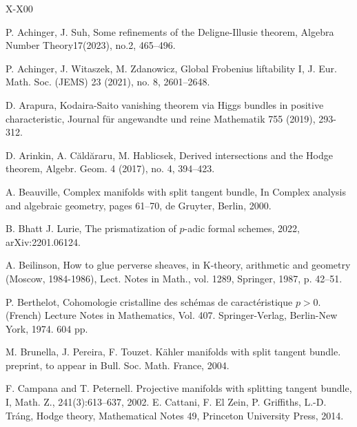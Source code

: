 \documentclass[12pt, a4paper]{article}
\begin{document}
\begin{thebibliography}{X-X00}
 
P. Achinger, J. Suh, Some refinements of the Deligne-Illusie theorem, Algebra Number Theory17(2023), no.2, 465–496.

P. Achinger, J. Witaszek, M. Zdanowicz, 
Global Frobenius liftability I,
J. Eur. Math. Soc. (JEMS) 23 (2021), no. 8, 2601–2648.

 	D. Arapura, Kodaira-Saito vanishing theorem via Higgs bundles in positive characteristic, Journal f\"{u}r angewandte und reine Mathematik 755 (2019), 293-312.
	
D. Arinkin, A. C\u{a}ld\u{a}raru, M. Hablicsek, Derived intersections and the Hodge theorem, Algebr. Geom. 4 (2017), no. 4, 394–423.
	

{}
A. Beauville, Complex manifolds with split tangent bundle, In Complex analysis
 and algebraic geometry, pages 61–70, de Gruyter, Berlin, 2000.
    
B. Bhatt J. Lurie, The prismatization of $p$-adic formal schemes, 2022, arXiv:2201.06124.

	A. Beilinson, How to glue perverse sheaves, in K-theory, arithmetic and geometry (Moscow, 1984-1986), Lect. Notes in Math., vol. 1289, Springer, 1987, p. 42–51.	
	
 	 P. Berthelot, Cohomologie cristalline des sch\'emas de caract\'eristique $p>0$. (French) Lecture Notes in Mathematics, Vol. 407. Springer-Verlag, Berlin-New York, 1974. 604 pp.

M. Brunella, J. Pereira, F. Touzet. K\"ahler manifolds with split
 tangent bundle. preprint, to appear in Bull. Soc. Math. France, 2004.
 
 	F. Campana and T. Peternell. Projective manifolds with splitting tangent
 bundle, I,  Math. Z., 241(3):613–637, 2002.
 	E. Cattani, F. El Zein, P. Griffiths, L.-D. Tr\'{a}ng, Hodge theory, Mathematical Notes 49, Princeton University Press, 2014.
	

\end{thebibliography}
\end{document}
